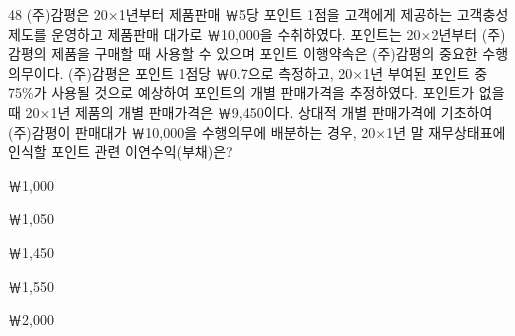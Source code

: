 \begin{question}{48}
(주)감평은 20×1년부터 제품판매 ￦5당 포인트 1점을 고객에게 제공하는 고객충성제도를 운영하고 제품판매 대가로 ￦10,000을 수취하였다. 포인트는 20×2년부터 (주)감평의 제품을 구매할 때 사용할 수 있으며 포인트 이행약속은 (주)감평의 중요한 수행의무이다. (주)감평은 포인트 1점당 ￦0.7으로 측정하고, 20×1년 부여된 포인트 중 75\%가 사용될 것으로 예상하여 포인트의 개별 판매가격을 추정하였다. 포인트가 없을 때 20×1년 제품의 개별 판매가격은 ￦9,450이다. 상대적 개별 판매가격에 기초하여 (주)감평이 판매대가 ￦10,000을 수행의무에 배분하는 경우, 20×1년 말 재무상태표에 인식할 포인트 관련 이연수익(부채)은?
\begin{choices}
  \item ￦1,000
  \item ￦1,050
  \item ￦1,450
  \item ￦1,550
  \item ￦2,000
\end{choices}
\end{question}
